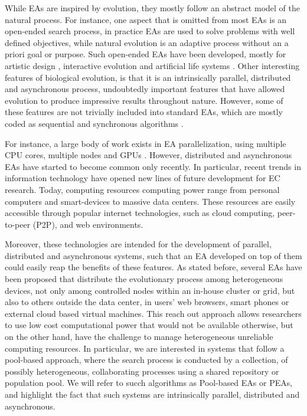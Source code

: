 \documentclass{sig-alternate}
\begin{document}
While EAs are inspired by evolution, they mostly follow an abstract model of the natural process.
For instance, one aspect that is omitted from most EAs is an open-ended search process,
in practice EAs are used to solve problems with well defined objectives, while natural evolution is an adaptive process without an a priori goal or purpose.
Such open-ended EAs have been developed, mostly for artistic design \cite{Musart}, interactive evolution \cite{ie1} and artificial life systems \cite{avida}.
Other interesting features of biological evolution, is that it is an intrinsically parallel, distributed and asynchronous process,
undoubtedly important features that have allowed evolution to produce impressive results throughout nature.
However, some of these features are not trivially included into standard EAs,
which are mostly coded as sequential and synchronous algorithms \cite{eiben}.

For instance, a large body of work exists in EA parallelization, using multiple CPU cores, multiple nodes and GPUs \cite{}.
However, distributed and asynchronous EAs have started to become common only recently.
In particular, recent trends in information technology have opened new lines of future development for EC research.
Today, computing resources computing power range from personal computers and smart-devices to massive data centers.
These resources are easily accessible through popular internet technologies, such as cloud computing, 
peer-to-peer (P2P), and web environments.

Moreover, these technologies are intended for the development of parallel, distributed and asynchronous systems,
such that an EA developed on top of them could easily reap the benefits of these features.
As stated before, several EAs have been proposed that distribute  the evolutionary process among heterogeneous devices, not only among controlled
nodes within an in-house cluster or grid, but also to others outside the data center, in users' web browsers, smart phones or external cloud based virtual machines.
This reach out approach allows researchers to use low cost computational 
power that would not be available otherwise, but on the other hand, have the 
challenge to manage heterogeneous unreliable computing resources. 
In particular, we are interested in systems that follow a pool-based approach, where the search process is conducted
by a collection, of possibly heterogeneous, collaborating processes using a shared repository or population pool.
We will refer to succh algorithms as Pool-based EAs or PEAs, and highlight the fact that such systems are
intrinsically parallel, distributed and asynchronous.
\end{document}
